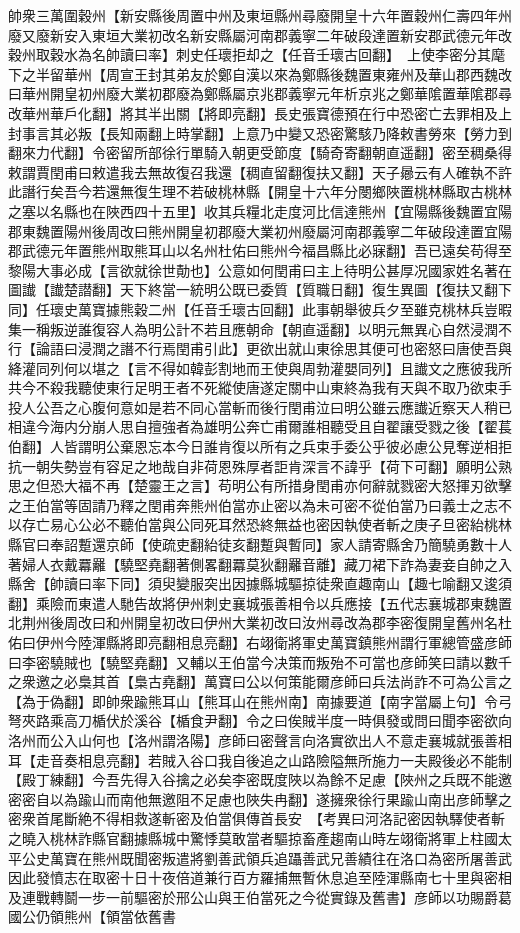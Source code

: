 帥衆三萬圍穀州【新安縣後周置中州及東垣縣州尋廢開皇十六年置穀州仁壽四年州廢又廢新安入東垣大業初改名新安縣屬河南郡義寧二年破段達置新安郡武德元年改穀州取穀水為名帥讀曰率】刺史任瓌拒却之【任音壬瓌古回翻】　上使李密分其麾下之半留華州【周宣王封其弟友於鄭自漢以來為鄭縣後魏置東雍州及華山郡西魏改曰華州開皇初州廢大業初郡廢為鄭縣屬京兆郡義寧元年析京兆之鄭華隂置華隂郡尋改華州華戶化翻】將其半出關【將即亮翻】長史張寶德預在行中恐密亡去罪相及上封事言其必叛【長知兩翻上時掌翻】上意乃中變又恐密驚駭乃降敕書勞來【勞力到翻來力代翻】令密留所部徐行單騎入朝更受節度【騎奇寄翻朝直遥翻】密至稠桑得敕謂賈閏甫曰敕遣我去無故復召我還【稠直留翻復扶又翻】天子曏云有人確執不許此譖行矣吾今若還無復生理不若破桃林縣【開皇十六年分閿鄉陜置桃林縣取古桃林之塞以名縣也在陜西四十五里】收其兵糧北走度河比信達熊州【宜陽縣後魏置宜陽郡東魏置陽州後周改曰熊州開皇初郡廢大業初州廢屬河南郡義寧二年破段達置宜陽郡武德元年置熊州取熊耳山以名州杜佑曰熊州今福昌縣比必寐翻】吾已遠矣苟得至黎陽大事必成【言欲就徐世勣也】公意如何閏甫曰主上待明公甚厚况國家姓名著在圖䜟【䜟楚譛翻】天下終當一統明公既已委質【質職日翻】復生異圖【復扶又翻下同】任瓌史萬寶據熊穀二州【任音壬瓌古回翻】此事朝舉彼兵夕至雖克桃林兵豈暇集一稱叛逆誰復容人為明公計不若且應朝命【朝直遥翻】以明元無異心自然浸潤不行【論語曰浸潤之譖不行焉閏甫引此】更欲出就山東徐思其便可也密怒曰唐使吾與絳灌同列何以堪之【言不得如韓彭割地而王使與周勃灌嬰同列】且䜟文之應彼我所共今不殺我聽使東行足明王者不死縱使唐遂定關中山東終為我有天與不取乃欲束手投人公吾之心腹何意如是若不同心當斬而後行閏甫泣曰明公雖云應䜟近察天人稍已相違今海内分崩人思自擅強者為雄明公奔亡甫爾誰相聽受且自翟讓受戮之後【翟萇伯翻】人皆謂明公棄恩忘本今日誰肯復以所有之兵束手委公乎彼必慮公見奪逆相拒抗一朝失勢豈有容足之地哉自非荷恩殊厚者詎肯深言不諱乎【荷下可翻】願明公熟思之但恐大福不再【楚靈王之言】苟明公有所措身閏甫亦何辭就戮密大怒揮刃欲擊之王伯當等固請乃釋之閏甫奔熊州伯當亦止密以為未可密不從伯當乃曰義士之志不以存亡易心公必不聽伯當與公同死耳然恐終無益也密因執使者斬之庚子旦密紿桃林縣官曰奉詔蹔還京師【使疏吏翻紿徒亥翻蹔與暫同】家人請寄縣舍乃簡驍勇數十人著婦人衣戴羃䍦【驍堅堯翻著側畧翻羃莫狄翻䍦音離】藏刀裙下詐為妻妾自帥之入縣舍【帥讀曰率下同】須臾變服突出因據縣城驅掠徒衆直趣南山【趣七喻翻又逡須翻】乘險而東遣人馳告故將伊州刺史襄城張善相令以兵應接【五代志襄城郡東魏置北荆州後周改曰和州開皇初改曰伊州大業初改曰汝州尋改為郡李密復開皇舊州名杜佑曰伊州今陸渾縣將即亮翻相息亮翻】右翊衛將軍史萬寶鎮熊州謂行軍總管盛彦師曰李密驍賊也【驍堅堯翻】又輔以王伯當今决策而叛殆不可當也彦師笑曰請以數千之衆邀之必梟其首【梟古堯翻】萬寶曰公以何策能爾彦師曰兵法尚詐不可為公言之【為于偽翻】即帥衆踰熊耳山【熊耳山在熊州南】南據要道【南字當屬上句】令弓弩夾路乘高刀楯伏於溪谷【楯食尹翻】令之曰俟賊半度一時俱發或問曰聞李密欲向洛州而公入山何也【洛州謂洛陽】彦師曰密聲言向洛實欲出人不意走襄城就張善相耳【走音奏相息亮翻】若賊入谷口我自後追之山路險隘無所施力一夫殿後必不能制【殿丁練翻】今吾先得入谷擒之必矣李密既度陜以為餘不足慮【陜州之兵既不能邀密密自以為踰山而南他無邀阻不足慮也陜失冉翻】遂擁衆徐行果踰山南出彦師擊之密衆首尾斷絶不得相救遂斬密及伯當俱傳首長安　【考異曰河洛記密因執驛使者斬之曉入桃林詐縣官翻據縣城中驚悸莫敢當者驅掠畜產趨南山時左翊衛將軍上柱國太平公史萬寶在熊州既聞密叛遣將劉善武領兵追躡善武兄善績往在洛口為密所屠善武因此發憤志在取密十日十夜倍道兼行百方羅捕無暫休息追至陸渾縣南七十里與密相及連戰轉鬬一步一前驅密於邢公山與王伯當死之今從實錄及舊書】彦師以功賜爵葛國公仍領熊州【領當依舊書